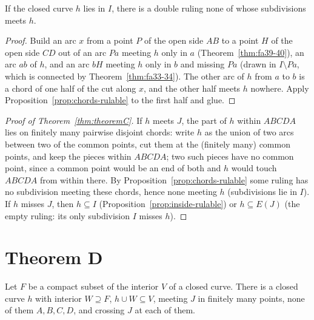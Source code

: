 
\begin{proposition}\label{prop:inside-rulable}
If the closed curve $h$ lies in $I$, there is a double ruling none of whose subdivisions meets $h$.
\end{proposition}

\begin{proof}
Build an arc $x$ from a point $P$ of the open side $AB$ to a point $H$ of the open side $CD$ out of an arc $Pa$ meeting $h$ only in $a$
(Theorem~\ref{thm:fa39-40}), an arc $ab$ of $h$, and an arc $bH$ meeting $h$ only in $b$ and missing $Pa$ (drawn in $I\setminus Pa$,
which is connected by Theorem~\ref{thm:fa33-34}). The other arc of $h$ from $a$ to $b$ is a chord of one half of the cut along $x$, and
the other half meets $h$ nowhere. Apply Proposition~\ref{prop:chords-rulable} to the first half and glue.
\end{proof}


\begin{proof}[Proof of Theorem~\ref{thm:theoremC}]
If $h$ meets $J$, the part of $h$ within $ABCDA$ lies on finitely many pairwise disjoint chords: write $h$ as the union of two arcs
between two of the common points, cut them at the (finitely many) common points, and keep the pieces within $ABCDA$; two such pieces
have no common point, since a common point would be an end of both and $h$ would touch $ABCDA$ from within there. By
Proposition~\ref{prop:chords-rulable} some ruling has no subdivision meeting these chords, hence none meeting $h$ (subdivisions lie in
$I$). If $h$ misses $J$, then $h\subseteq I$ (Proposition~\ref{prop:inside-rulable}) or $h\subseteq E(J)$ (the empty ruling: its only
subdivision $I$ misses $h$).
\end{proof}


\section{Theorem D}

\begin{proposition}\label{prop:nice-curve}
Let $F$ be a compact subset of the interior $V$ of a closed curve. There is a closed curve $h$ with interior $W\supseteq F$, $h\cup
W\subseteq V$, meeting $J$ in finitely many points, none of them $A,B,C,D$, and crossing $J$ at each of them.
\end{proposition}

